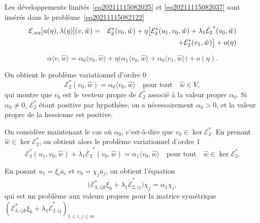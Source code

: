 \documentclass[12pt, final]{amsart}
\begin{document}
Les développements limités~\eqref{eq20211115082025} et
\eqref{eq20211115082037} sont insérés dans le
problème~\eqref{eq20211115082122}
\begin{eqnarray}
  \notag
  \mathcal E_{,uu}[u(\eta ), \lambda (\eta )](v, \hat{w})
  &=&\mathcal E_2^*(v_0, \hat{w})+\eta \bigl[\mathcal E_3^*(u_1, v_0, \hat{w})+\lambda _1\dot{\mathcal E_2}^*(v_0, \hat{w})\\
  &&+\mathcal E_2^*(v_1, \hat{w})\bigr]+o(\eta )
\end{eqnarray}

\begin{equation}
  \alpha\langle  v, \hat{w}\rangle =\alpha_0\langle v_0, \hat{w}\rangle +\eta \bigl(\alpha_1\langle  v_0, \hat{w}\rangle +\alpha_0\langle  v_1, \hat{w}\rangle \bigr)+o(\eta ).
\end{equation}

On obtient le problème variationnel d'ordre 0
\begin{equation}
  \mathcal E_2^*(v_0, \hat{w})=\alpha_0\langle v_0, \hat{w}\rangle \quad\text{pour tout}\quad\hat{w}\in V,
\end{equation}
qui montre que \(v_0\) est le vecteur propre de \(\mathcal E_2^*\) associé à la valeur
propre \(\alpha_0\). Si \(\alpha_0\neq 0\), \(\mathcal E_2^*\) étant positive par hypothèse, on a
nécessairement \(\alpha_0>0\), et la valeur propre de la hessienne est positive.

On considère maintenant le cas où \(\alpha_0\), c'est-à-dire que \(v_0\in\ker\mathcal E_2^*\). En
prenant \(\hat{w}\in\ker\mathcal E_2^*\), on obtient alors le problème variationnel d'ordre
1
\begin{equation}
  \mathcal E_3^*(u_1, v_0, \hat{w})+\lambda _1\dot{\mathcal E_2}^*(v_0, \hat{w})=\alpha_1\langle v_0, \hat{w}\rangle
  \quad\text{pour tout}\quad\hat{w}\in\ker\mathcal E_2^*.
\end{equation}

En posant \(u_1=\xi _ia_i\) et \(v_0=\chi _ja_j\), on obtient l'équation
\begin{equation}
  \bigl(\mathcal E_{3,ijk}^*\xi _k+\lambda _1\dot{\mathcal E}_{2, ij}^*\bigr)\chi _j=\alpha_1\chi _i,
\end{equation}
qui est un problème aux valeurs propres pour la matrice symétrique
\((\mathcal E_{3, ijk}^*\xi _k+\lambda _1\dot{\mathcal E}_{2,ij}^*)_{1\leq i, j\leq m}\)

\end{document}
